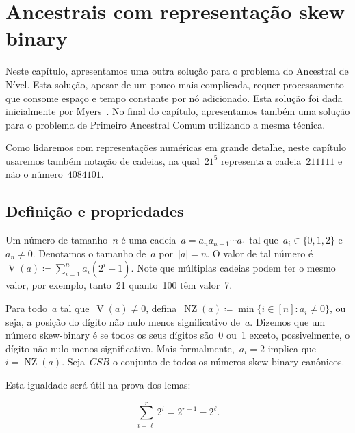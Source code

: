 \documentclass[main.tex]{subfiles}
\newcommand{\NZ}{\operatorname{NZ}}
\newcommand{\CSB}{\textit{CSB}}
\renewcommand{\V}{\operatorname{V}}
\begin{document}
\chapter{Ancestrais com representação skew binary} \label{cap:skew}

Neste capítulo, apresentamos uma outra solução para o problema do Ancestral de Nível. Esta solução, apesar de um pouco mais complicada, requer processamento que consome espaço e tempo constante por nó adicionado. Esta solução foi dada inicialmente por Myers~\cite{Myers83}. No final do capítulo, apresentamos também uma solução para o problema de Primeiro Ancestral Comum utilizando a mesma técnica.

Como lidaremos com representações numéricas em grande detalhe, neste capítulo usaremos também notação de cadeias, na qual~$21^5$ representa a cadeia~$211111$ e não o número~$4084101$.

\section{Definição e propriedades}

Um número  de tamanho~$n$ é uma cadeia~${a = a_n a_{n-1} \cdots a_1}$ tal que~${a_i \in \{0, 1, 2\}}$ e~$a_n \neq 0$. Denotamos o tamanho de~$a$ por~$|a| = n$. O valor de tal número é~${\V(a) \coloneqq \sum\limits_{i = 1}^n{a_i (2^i - 1)}}$. Note que múltiplas cadeias podem ter o mesmo valor, por exemplo, tanto~21 quanto~100 têm valor~7.

Para todo~$a$ tal que~$\V(a) \neq 0$, defina~$\NZ(a) \coloneqq \min\{i \in [n] : a_i \neq 0\}$, ou seja, a posição do dígito não nulo menos significativo de~$a$. Dizemos que um número skew-binary é  se todos os seus dígitos são~0 ou~1 exceto, possivelmente, o dígito não nulo menos significativo. Mais formalmente,~${a_i = 2}$ implica que ${i = \NZ(a)}$. Seja~$\CSB$ o conjunto de todos os números skew-binary canônicos.

Esta igualdade será útil na prova dos lemas:

\begin{equation} \tag{A} \label{eq:sum2}
	\sum\limits_{i = \ell}^r{2^i} = 2^{r+1} - 2^{\ell}.
\end{equation}
\end{document}
